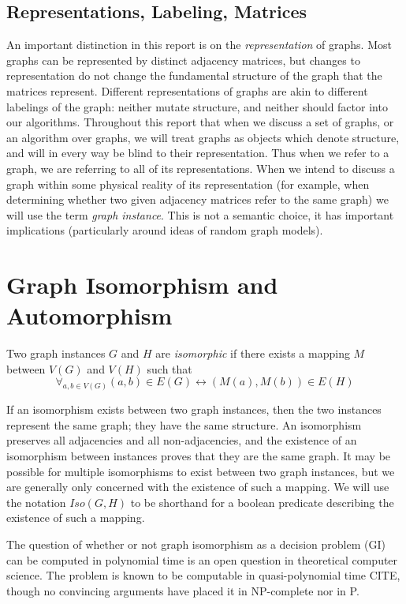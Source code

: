 \documentclass[11pt,a4paper]{report}
\begin{document}
\subsection{Representations, Labeling, Matrices}
An important distinction in this report is on the \emph{representation} of graphs.
Most graphs can be represented by distinct adjacency matrices, but changes to representation do not change the fundamental structure of the graph that the matrices represent.
Different representations of graphs are akin to different labelings of the graph: neither mutate structure, and neither should factor into our algorithms.
Throughout this report that when we discuss a set of graphs, or an algorithm over graphs, we will treat graphs as objects which denote structure, and will in every way be blind to their representation.
Thus when we refer to a graph, we are referring to all of its representations.
When we intend to discuss a graph within some physical reality of its representation (for example, when determining whether two given adjacency matrices refer to the same graph) we will use the term \emph{graph instance}.
This is not a semantic choice, it has important implications (particularly around ideas of random graph models).

\section{Graph Isomorphism and Automorphism}
Two graph instances $G$ and $H$ are \emph{isomorphic} if there exists a mapping $M$ between $V(G)$ and $V(H)$ such that $$\forall_{a, b \in V(G)} (a, b) \in E(G) \leftrightarrow (M(a), M(b)) \in E(H)$$

If an isomorphism exists between two graph instances, then the two instances represent the same graph; they have the same structure.
An isomorphism preserves all adjacencies and all non-adjacencies, and the existence of an isomorphism between instances proves that they are the same graph.
It may be possible for multiple isomorphisms to exist between two graph instances, but we are generally only concerned with the existence of such a mapping.
We will use the notation $Iso(G, H)$ to be shorthand for a boolean predicate describing the existence of such a mapping.

The question of whether or not graph isomorphism as a decision problem (GI) can be computed in polynomial time is an open question in theoretical computer science.
The problem is known to be computable in quasi-polynomial time CITE, though no convincing arguments have placed it in NP-complete nor in P.
\end{document}
